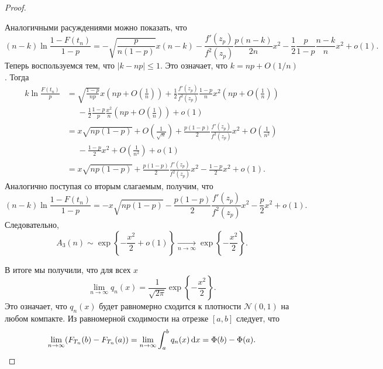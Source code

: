 \begin{proof}
\begin{enumerate}
		Аналогичными расуждениями можно показать, что
		\[
			(n - k)\ln \frac{1 - F(t_{n})}{1 - p} = -\sqrt{\frac{p}{n(1 - p)}}x(n - k) - \frac{f'(z_{p})}{f^{2}(z_{p})}\frac{p(n - k)}{2n}x^{2} - \frac{1}{2}\frac{p}{1 - p}\frac{n - k}{n}x^{2} + o(1).
		\]
		Теперь воспользуемся тем, что $|k - np| \leq 1$.
		Это означает, что $k = np + O(1/n)$.
		Тогда
		\begin{align*}
			k\ln \frac{F(t_{n})}{p} 
			&= \sqrt{\frac{1 - p}{np}}x\left(np + O\left(\frac{1}{n}\right)\right) + \frac{1}{2}\frac{f'(z_{p})}{f^2(z_{p})}\frac{1 - p}{n}x^{2}\left(np + O\left(\frac{1}{n}\right)\right) \\
			&\phantom{=}-\frac{1}{2}\frac{1 - p}{p}\frac{x^{2}}{n}\left(np + O\left(\frac{1}{n}\right)\right) + o(1) \\
			&= x\sqrt{np(1 - p)} + O\left(\frac{1}{\sqrt{n}}\right) + \frac{p(1 - p)}{2}\frac{f'(z_{p})}{f^{2}(z_{p})}x^{2} + O\left(\frac{1}{n^{2}}\right) \\
			&\phantom{=}-\frac{1 - p}{2}x^{2} + O\left(\frac{1}{n^{2}}\right) + o(1) \\
			&= x\sqrt{np(1 - p)} + \frac{p(1 - p)}{2}\frac{f'(z_{p})}{f^{2}(z_{p})}x^{2} - \frac{1 - p}{2}x^{2} + o(1).
		\end{align*}
		Аналогично поступая со вторым слагаемым, получим, что
		\[
			(n - k)\ln \frac{1 - F(t_{n})}{1 - p} = -x\sqrt{np(1 - p)} - \frac{p(1 - p)}{2}\frac{f'(z_{p})}{f^{2}(z_{p})}x^{2} - \frac{p}{2}x^{2} + o(1).
		\]
		Следовательно,
		\[
			A_{3}(n) \sim \exp\left\{-\frac{x^{2}}{2} + o(1)\right\} \xrightarrow[n \to \infty]{} \exp\left\{-\frac{x^{2}}{2}\right\}.
		\]
	\end{enumerate}
	
	В итоге мы получили, что для всех $x$
	\[
		\lim\limits_{n \to \infty} q_{n}(x) = \frac{1}{\sqrt{2\pi}}\exp\left\{-\frac{x^{2}}{2}\right\}.
	\]
	Это означает, что $q_{n}(x)$ будет равномерно сходится к плотности $\mathcal{N}(0, 1)$ на любом компакте.
	Из равномерной сходимости на отрезке $[a, b]$ следует, что
	\[
		\lim\limits_{n \to \infty} (F_{T_{n}}(b) - F_{T_{n}}(a)) = \lim\limits_{n \to \infty} \int_{a}^{b} q_{n}(x)\mathop{}\!\mathrm{d} x = \Phi(b) - \Phi(a).
	\]
	

\end{proof}

